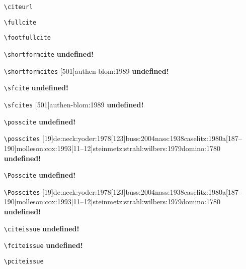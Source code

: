 \documentclass[a4paper,12pt]{scrartcl}
\newcommand*{\Befehl}[1]{\texttt{\textbackslash#1}}
\begin{document}
\begin{enumerate}
    \item[\footnotesize\Befehl{citeurl}] 
    \item[\footnotesize\Befehl{fullcite}] 
    \item[\footnotesize\Befehl{footfullcite}] 
    \item[\footnotesize\Befehl{shortformcite}] 
        {}
        {\textbf{undefined!}}%
    \item[\footnotesize\Befehl{shortformcites}] 
        {[501]{authen-blom:1989}}
        {\textbf{undefined!}}%
    \item[\footnotesize\Befehl{sfcite}] 
        {}
        {\textbf{undefined!}}%
    \item[\footnotesize\Befehl{sfcites}] 
        {[501]{authen-blom:1989}}
        {\textbf{undefined!}}%
    \item[\footnotesize\Befehl{posscite}] 
        {}
        {\textbf{undefined!}}%
    \item[\footnotesize\Befehl{posscites}] 
        {[19]{de:neck:yoder:1978}[123]{buss:2004}{nass:1938}{caselitz:1980a}[187--190]{molleson:cox:1993}[11--12]{steinmetz:strahl:wilbers:1979}{domino:1780}}
        {\textbf{undefined!}}%
    \item[\footnotesize\Befehl{Posscite}] 
        {}
        {\textbf{undefined!}}%
    \item[\footnotesize\Befehl{Posscites}] 
        {[19]{de:neck:yoder:1978}[123]{buss:2004}{nass:1938}{caselitz:1980a}[187--190]{molleson:cox:1993}[11--12]{steinmetz:strahl:wilbers:1979}{domino:1780}}
        {\textbf{undefined!}}%
	\item[\footnotesize\Befehl{citeissue}] 
        {}
        {\textbf{undefined!}}%
	\item[\footnotesize\Befehl{fciteissue}] 
        {}
        {\textbf{undefined!}}%
	\item[\footnotesize\Befehl{pciteissue}] 
        {}

\end{enumerate}
\end{document}
